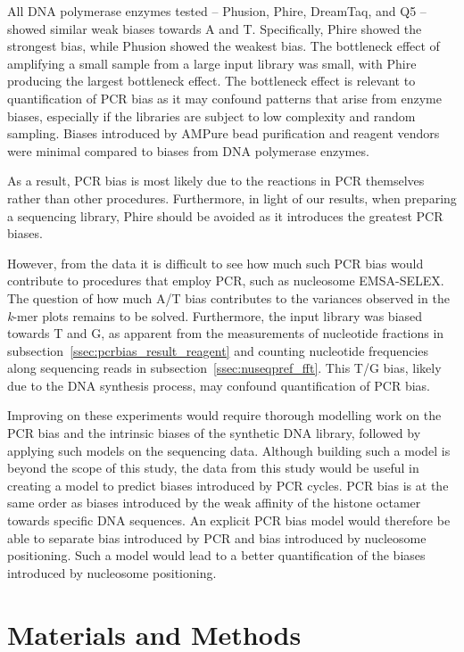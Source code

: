 \documentclass[parskip=full, numbers=noenddot]{scrbook}
\begin{document}
All DNA polymerase enzymes tested -- Phusion, Phire, DreamTaq, and Q5  -- showed similar weak biases towards A and T.  Specifically, Phire showed the strongest bias, while Phusion showed the weakest bias.  The bottleneck effect of amplifying a small sample from a large input library was small, with Phire producing the largest bottleneck effect.  The bottleneck effect is relevant to quantification of PCR bias as it may confound patterns that arise from enzyme biases, especially if the libraries are subject to low complexity and random sampling.  Biases introduced by AMPure bead purification and reagent vendors were minimal compared to biases from DNA polymerase enzymes.

As a result, PCR bias is most likely due to the reactions in PCR themselves rather than other procedures.  Furthermore, in light of our results, when preparing a sequencing library, Phire should be avoided as it introduces the greatest PCR biases.

However, from the data it is difficult to see how much such PCR bias would contribute to procedures that employ PCR, such as nucleosome EMSA-SELEX.  The question of how much A/T bias contributes to the variances observed in the \emph{k}-mer plots remains to be solved.  Furthermore, the input library was biased towards T and G, as apparent from the measurements of nucleotide fractions in subsection~\ref{ssec:pcrbias_result_reagent} and counting nucleotide frequencies along sequencing reads in subsection~\ref{ssec:nuseqpref_fft}.  This T/G bias, likely due to the DNA synthesis process, may confound quantification of PCR bias.

Improving on these experiments would require thorough modelling work on the PCR bias and the intrinsic biases of the synthetic DNA library, followed by applying such models on the sequencing data.  Although building such a model is beyond the scope of this study, the data from this study would be useful in creating a model to predict biases introduced by PCR cycles.  PCR bias is at the same order as biases introduced by the weak affinity of the histone octamer towards specific DNA sequences.  An explicit PCR bias model would therefore be able to separate bias introduced by PCR and bias introduced by nucleosome positioning.  Such a model would lead to a better quantification of the biases introduced by nucleosome positioning.

\section{Materials and Methods}
\label{sec:pcrbias_methods}
\end{document}
